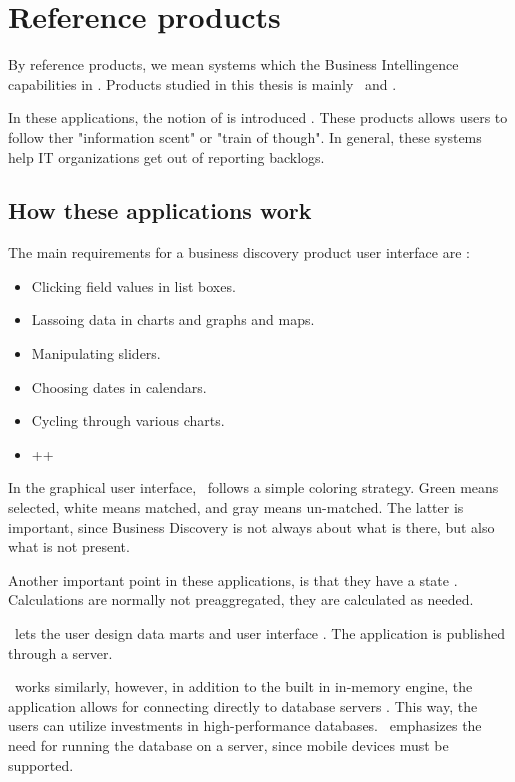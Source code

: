 \section{Reference products}
\label{sec:Reference products}
By reference products, we mean systems which the Business Intellingence capabilities in \genusSoftware. Products studied in this thesis is mainly \qlikview~and \tableau.

In these applications, the notion of  is introduced \cite{Kamkolkar2015-iq, Qlik2014-vd}. These products allows users to follow ther "information scent" or "train of though". In general, these systems help IT organizations get out of reporting backlogs.

\subsection{How these applications work}
\label{sub:How these applications work}
The main requirements for a business discovery product user interface are \cite{Qlik2014-vd}:
\begin{itemize}
  \item Clicking field values in list boxes.
  \item Lassoing data in charts and graphs and maps.
  \item Manipulating sliders.
  \item Choosing dates in calendars.
  \item Cycling through various charts.
  \item ++
\end{itemize}
In the graphical user interface, \qlikview~follows a simple coloring strategy. Green means selected, white means matched, and gray means un-matched. The latter is important, since Business Discovery is not always about what is there, but also what is not present.

Another important point in these applications, is that they have a state \cite{Qlik2014-vd}. Calculations are normally not preaggregated, they are calculated as needed. 


\qlikview~lets the user design data marts and user interface \cite{Qlik2011-ef}. The application is published through a server.

\tableau~works similarly, however, in addition to the built in in-memory engine, the application allows for connecting directly to database servers \cite{Kamkolkar2015-iq}. This way, the users can utilize investments in high-performance databases. \tableau~emphasizes the need for running the database on a server, since mobile devices must be supported. 

